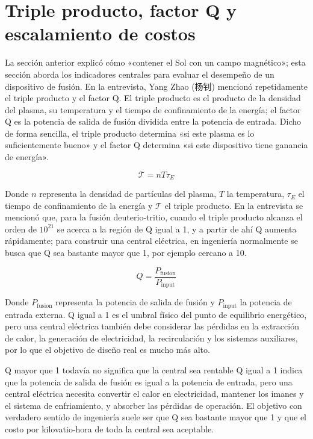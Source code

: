 \section{Triple producto, factor Q y escalamiento de costos}

La sección anterior explicó cómo «contener el Sol con un campo magnético»; esta sección aborda los indicadores centrales para evaluar el desempeño de un dispositivo de fusión. En la entrevista, Yang Zhao (杨钊) mencionó repetidamente el triple producto y el factor Q. El triple producto es el producto de la densidad del plasma, su temperatura y el tiempo de confinamiento de la energía; el factor Q es la potencia de salida de fusión dividida entre la potencia de entrada. Dicho de forma sencilla, el triple producto determina «si este plasma es lo suficientemente bueno» y el factor Q determina «si este dispositivo tiene ganancia de energía».

\[
\mathcal{T}=n T \tau_E
\]

Donde $n$ representa la densidad de partículas del plasma, $T$ la temperatura, $\tau_E$ el tiempo de confinamiento de la energía y $\mathcal{T}$ el triple producto. En la entrevista se mencionó que, para la fusión deuterio-tritio, cuando el triple producto alcanza el orden de $10^{21}$ se acerca a la región de Q igual a 1, y a partir de ahí Q aumenta rápidamente; para construir una central eléctrica, en ingeniería normalmente se busca que Q sea bastante mayor que 1, por ejemplo cercano a 10.

\[
Q=\frac{P_{\mathrm{fusion}}}{P_{\mathrm{input}}}
\]

Donde $P_{\mathrm{fusion}}$ representa la potencia de salida de fusión y $P_{\mathrm{input}}$ la potencia de entrada externa. Q igual a 1 es el umbral físico del punto de equilibrio energético, pero una central eléctrica también debe considerar las pérdidas en la extracción de calor, la generación de electricidad, la recirculación y los sistemas auxiliares, por lo que el objetivo de diseño real es mucho más alto.

\begin{importantbox}{Q mayor que 1 todavía no significa que la central sea rentable}
Q igual a 1 indica que la potencia de salida de fusión es igual a la potencia de entrada, pero una central eléctrica necesita convertir el calor en electricidad, mantener los imanes y el sistema de enfriamiento, y absorber las pérdidas de operación. El objetivo con verdadero sentido de ingeniería suele ser que Q sea bastante mayor que 1 y que el costo por kilovatio-hora de toda la central sea aceptable.
\end{importantbox}

